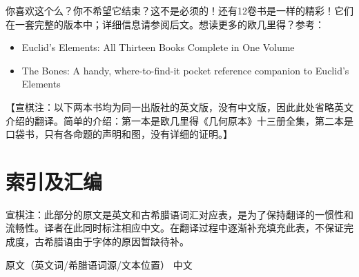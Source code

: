 \documentclass[
]{book}
\begin{document}
你喜欢这个么？你不希望它结束？这不是必须的！还有12卷书是一样的精彩！它们在一套完整的版本中；详细信息请参阅后文。想读更多的欧几里得？参考：

\begin{itemize}
\item
  Euclid's Elements: All Thirteen Books Complete in One Volume
\item
  The Bones: A handy, where-to-find-it pocket reference companion to Euclid's Elements
\end{itemize}

【宣棋注：以下两本书均为同一出版社的英文版，没有中文版，因此此处省略英文介绍的翻译。简单的介绍：第一本是欧几里得《几何原本》十三册全集，第二本是口袋书，只有各命题的声明和图，没有详细的证明。】

\hypertarget{ux7d22ux5f15ux53caux6c47ux7f16}{%
\chapter*{索引及汇编}\label{ux7d22ux5f15ux53caux6c47ux7f16}}

宣棋注：此部分的原文是英文和古希腊语词汇对应表，是为了保持翻译的一惯性和流畅性。译者在此同时标注相应中文。在翻译过程中逐渐补充填充此表，不保证完成度，古希腊语由于字体的原因暂缺待补。

原文（英文词/希腊语词源/文本位置） 中文
\end{document}
